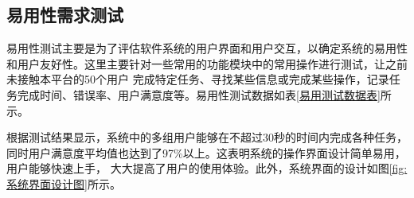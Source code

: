 \subsection{易用性需求测试}

易用性测试主要是为了评估软件系统的用户界面和用户交互，以确定系统的易用性和用户友好性。这里主要针对一些常用的功能模块中的常用操作进行测试，让之前未接触本平台的50个用户
完成特定任务、寻找某些信息或完成某些操作，记录任务完成时间、错误率、用户满意度等。易用性测试数据如表\ref{易用测试数据表}所示。


\begin{center}
    \renewcommand\arraystretch{1.5}{
    }
    \vspace{-1cm}
\end{center}

根据测试结果显示，系统中的多组用户能够在不超过30秒的时间内完成各种任务，同时用户满意度平均值也达到了97\%以上。这表明系统的操作界面设计简单易用，用户能够快速上手，
大大提高了用户的使用体验。此外，系统界面的设计如图\ref{fig:系统界面设计图}所示。

